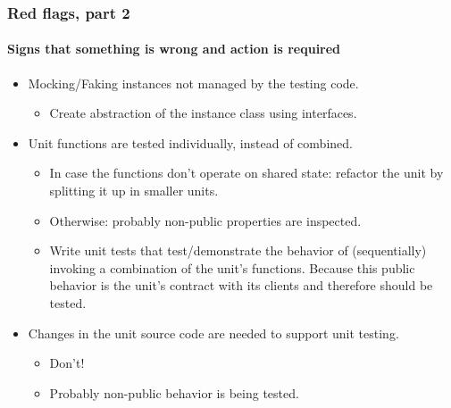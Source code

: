 \begin{frame}
	\frametitle{Red flags, part 2}
	\framesubtitle{Signs that something is wrong and action is required}

	\begin{itemize}[<+-| highlight@+>]
		\item Mocking/Faking instances not managed by the testing code.
		\begin{itemize}[<+-| highlight@+>]
			\item Create abstraction of the instance class using interfaces.
		\end{itemize}
		\item Unit functions are tested individually, instead of combined.
		\begin{itemize}[<+-| highlight@+>]
			\item In case the functions don't operate on shared state: refactor the unit by splitting it up in smaller units.
			\item Otherwise: probably non-public properties are inspected.
			\item Write unit tests that test/demonstrate the behavior of (sequentially) invoking a combination of the unit's functions. Because this public behavior is the unit's contract with its clients and therefore \alert{should be tested}.
		\end{itemize}
		\item Changes in the unit source code are needed to support unit testing.
		\begin{itemize}[<+-| highlight@+>]
			\item Don't!
			\item Probably non-public behavior is being tested.
		\end{itemize}
	\end{itemize}
\end{frame}


